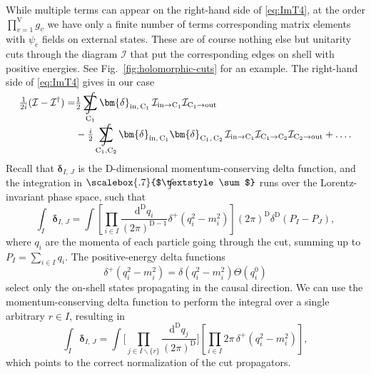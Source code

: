 \documentclass[12pt]{article}
\numberwithin{figure}{section}
\def \be {\begin{equation}}
\def \ee {\end{equation}}
\def \nn {\nonumber}
\def \CC {C}
\def \D {\mathrm{D}}
\def \d {\mathrm{d}}
\def \CC {\mathrm{C}}
\def \I {\mathcal{I}}
\def \inn {\mathrm{in}}
\def \out {\mathrm{out}}
\newcommand{\bdelta}[2]{\bm{\delta}_{#1 , \, #2}}
\DeclareMathOperator*{\sumint}{%
\mathchoice%
  {\ooalign{$\displaystyle\sum$\cr\hidewidth$\displaystyle\int$\hidewidth\cr}}
  {\ooalign{\raisebox{.14\height}{\scalebox{.7}{$\textstyle\sum$}}\cr\hidewidth$\textstyle\int$\hidewidth\cr}}
  {\ooalign{\raisebox{.2\height}{\scalebox{.6}{$\scriptstyle\sum$}}\cr$\scriptstyle\int$\cr}}
  {\ooalign{\raisebox{.2\height}{\scalebox{.6}{$\scriptstyle\sum$}}\cr$\scriptstyle\int$\cr}}
}
\begin{document}
	While multiple terms can appear on the right-hand side of \eqref{eq:ImT4}, at the order $\prod_{v=1}^{\mathrm{V}}g_v$ we have only a finite number of terms corresponding matrix elements with $\psi_e$ fields on external states. These are of course nothing else but unitarity cuts through the diagram $\I$ that put the corresponding edges on shell with positive energies. See Fig.~\ref{fig:holomorphic-cuts} for an example.
	The right-hand side of \eqref{eq:ImT4} gives in our case
	\begin{align}\label{eq:ImTL}
	\tfrac{1}{2i}( \I - \I^\dagger ) = & \tfrac{1 }{2}\sumint_{\CC_1} \bdelta{\inn}{\CC_1}\, \I_{\inn\to \CC_1} \I_{\CC_1\to \out}
	\\
	& -\tfrac{i}{2}\sumint_{\CC_1,\CC_2} \bdelta{\inn}{\CC_1} \bdelta{\CC_1}{\CC_2}\, \I_{\inn\to \CC_1} \I_{\CC_1 \to \CC_2} \I_{\CC_2\to \out} + \ldots.\nn
	\end{align}
	Recall that $\bdelta{I}{J}$ is the $\D$-dimensional momentum-conserving delta function, and the integration in $\sumint$ runs over the
	Lorentz-invariant phase space, such that
	\be
	    \int_I \bdelta{I}{J} = \int \left[ \prod_{i \in I} \frac{\d^{\D} q_i}{(2 \pi)^{\D-1}} \delta^+(q_i^2-m_i^2) 
	    \right] \left(2\pi\right)^{\D} \delta^\D(P_I-P_J),
	\ee
	where $q_i$ are the momenta of each particle going through the cut, summing up to $P_I = \sum_{i \in I} q_i$. The positive-energy delta functions
	\be
	\delta^+(q_i^2-m_i^2) = \delta(q_i^2-m_i^2) \Theta(q_i^0)
	\ee
	select only the on-shell states propagating in the causal direction.
	We can use the momentum-conserving delta function to perform the integral over a single arbitrary $r\in I$, resulting in
	\be
	    \int_I \bdelta{I}{J} = \int \Bigg[\prod_{j \in I \backslash \{r\}} \frac{\d^{\D} q_j}{(2 \pi)^{\D}} \Bigg] \left[ \prod_{i \in I} 2 \pi \, \delta^+(q_i^2-m_i^2) \right],
	    \label{eq:delta}
	\ee
    which points to the correct normalization of the cut propagators.
	
\end{document}
